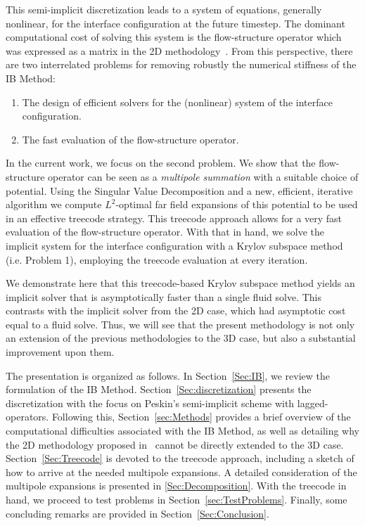 \documentclass[preprint,12pt]{elsarticle}
\begin{document}
This semi-implicit discretization leads to a system of equations, generally nonlinear,  for the interface configuration at the future timestep. The dominant computational cost of solving this system is the flow-structure operator which was expressed as  a matrix in the 2D methodology~\cite{IBM_Implicit2D}. From this perspective,  there are two interrelated problems for removing robustly the numerical stiffness of the IB Method:
\begin{enumerate}
\item The design of efficient  solvers for  the (nonlinear) system of the interface configuration.
\item The fast evaluation of the flow-structure operator. 
\end{enumerate}

In the current work,  we focus on the second problem. We show that the flow-structure operator can be seen as a {\em multipole summation} with a suitable choice of potential. Using the Singular Value Decomposition and a new, efficient,  iterative algorithm we compute $L^2$-optimal far field expansions of this potential to be used in an effective treecode strategy. This treecode approach  allows for a very fast evaluation of the flow-structure operator. With that in hand, we  solve the implicit system for the interface configuration with a Krylov subspace method (i.e. Problem 1), employing the treecode evaluation at every iteration.

We demonstrate here that this treecode-based Krylov subspace method yields an implicit solver that is asymptotically faster than a single fluid solve. This contrasts with the implicit solver from the 2D case, which had asymptotic cost equal to a fluid solve. Thus, we will see that the present methodology is not only an extension of the previous methodologies to the 3D case, but also a substantial improvement upon them.

The presentation is organized as follows. In Section~\ref{Sec:IB}, we review the formulation of the IB Method. Section~\ref{Sec:discretization} presents the discretization with the focus on  Peskin's semi-implicit scheme with lagged-operators. Following this, Section~\ref{sec:Methods} provides a brief overview of the computational difficulties associated with the IB Method, as well as detailing why the 2D methodology proposed in~\cite{IBM_Implicit2D}
cannot be directly extended to the 3D case.  Section~\ref{Sec:Treecode} is devoted to the treecode approach, including a sketch of how to arrive at the needed multipole expansions. A  detailed consideration of the multipole expansions is presented in \ref{Sec:Decomposition}. With the treecode in hand, we proceed to test problems in Section~\ref{sec:TestProblems}.  Finally, some concluding remarks are provided in Section~\ref{Sec:Conclusion}.
\end{document}
